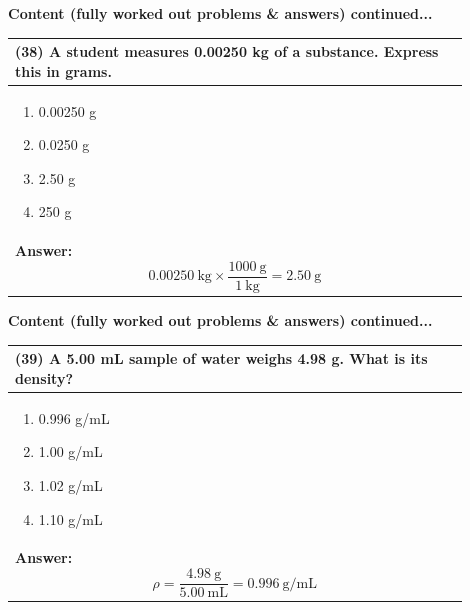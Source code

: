 \documentclass{article}
\begin{document}
\newpage
\noindent
{\large\textbf{Content (fully worked out problems \& answers) continued...}}\\[0.2em]
\vspace{0.2cm}
\begin{tabular}{|p{0.9\linewidth}|}
\hline
\vspace{0.2cm}
\textbf{(38)} A student measures 0.00250 kg of a substance. Express this in grams.\\
\hline
\vspace{0.2cm}
\begin{minipage}[t]{0.85\linewidth}
\begin{enumerate}[label=\alph*.]
\item 0.00250 g
\item 0.0250 g
\item 2.50 g
\item 250 g
\end{enumerate}
\end{minipage}\\
\hline
\vspace{0.2cm}
\textbf{Answer:} 
\[
0.00250~\text{kg} \times \frac{1000~\text{g}}{1~\text{kg}} = 2.50~\text{g}
\] \\ 
\hline
\end{tabular}

\newpage
\noindent
{\large\textbf{Content (fully worked out problems \& answers) continued...}}\\[0.2em]
\vspace{0.2cm}
\begin{tabular}{|p{0.9\linewidth}|}
\hline
\vspace{0.2cm}
\textbf{(39)} A 5.00 mL sample of water weighs 4.98 g. What is its density?\\
\hline
\vspace{0.2cm}
\begin{minipage}[t]{0.85\linewidth}
\begin{enumerate}[label=\alph*.]
\item 0.996 g/mL
\item 1.00 g/mL
\item 1.02 g/mL
\item 1.10 g/mL
\end{enumerate}
\end{minipage}\\
\hline
\vspace{0.2cm}
\textbf{Answer:} 
\[
\rho = \frac{4.98~\text{g}}{5.00~\text{mL}} = 0.996~\text{g/mL}
\] \\ 
\hline
\end{tabular}
\newpage
\end{document}
